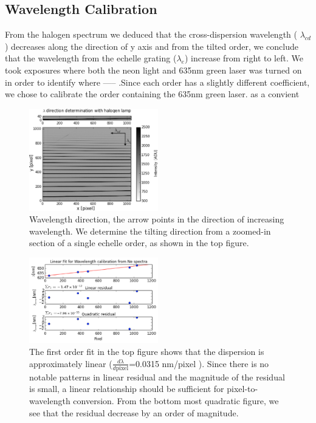 \documentclass[authoryear, 12pt,5p, times]{elsarticle}
\begin{document}
\subsection{Wavelength Calibration}
From the halogen spectrum we deduced that the cross-dispersion wavelength ( $\lambda_{cd}$) decreases along the direction of y axis and from the tilted order, we conclude that the wavelength from the echelle grating ($\lambda_{e}$) increase from right to left.
We took exposures where both the neon light and 635nm green laser was turned on in order to identify  where ----- .Since each order has a slightly different coefficient, we chose to calibrate the order containing the 635nm green laser. as a convient 
\begin{figure}[h!]
\includegraphics[width=0.5\textwidth]{figures/lambda_direction}
\caption{Wavelength direction, the arrow points in the direction of increasing wavelength. We determine the tilting direction from a zoomed-in section of a single echelle  order, as shown in the top figure.}
\label{lambda_direction}
\end{figure}
 \begin{figure}[h!]
\includegraphics[width=0.5\textwidth]{figures/wavelength_calib}
\caption{The first order fit in the top figure shows that the dispersion is approximately linear ($\frac{d\lambda}{d\text{pixel}}$=0.0315 nm/pixel ). Since there is no notable patterns in linear residual and the magnitude of the residual is small, a linear relationship should be sufficient for pixel-to-wavelength conversion. From the bottom most quadratic figure, we see that the residual decrease by an order of magnitude.}
\label{calib}
\end{figure}
\end{document}
